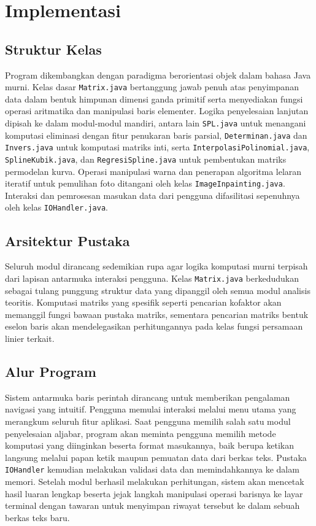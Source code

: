 \documentclass[12pt, a4paper]{article}
\begin{document}
\section{Implementasi}

\subsection{Struktur Kelas}
Program dikembangkan dengan paradigma berorientasi objek dalam bahasa Java murni. Kelas dasar \texttt{Matrix.java} bertanggung jawab penuh atas penyimpanan data dalam bentuk himpunan dimensi ganda primitif serta menyediakan fungsi operasi aritmatika dan manipulasi baris elementer. Logika penyelesaian lanjutan dipisah ke dalam modul-modul mandiri, antara lain \texttt{SPL.java} untuk menangani komputasi eliminasi dengan fitur penukaran baris parsial, \texttt{Determinan.java} dan \texttt{Invers.java} untuk komputasi matriks inti, serta \texttt{InterpolasiPolinomial.java}, \texttt{SplineKubik.java}, dan \texttt{RegresiSpline.java} untuk pembentukan matriks permodelan kurva. Operasi manipulasi warna dan penerapan algoritma lelaran iteratif untuk pemulihan foto ditangani oleh kelas \texttt{ImageInpainting.java}. Interaksi dan pemrosesan masukan data dari pengguna difasilitasi sepenuhnya oleh kelas \texttt{IOHandler.java}.

\subsection{Arsitektur Pustaka}
Seluruh modul dirancang sedemikian rupa agar logika komputasi murni terpisah dari lapisan antarmuka interaksi pengguna. Kelas \texttt{Matrix.java} berkedudukan sebagai tulang punggung struktur data yang dipanggil oleh semua modul analisis teoritis. Komputasi matriks yang spesifik seperti pencarian kofaktor akan memanggil fungsi bawaan pustaka matriks, sementara pencarian matriks bentuk eselon baris akan mendelegasikan perhitungannya pada kelas fungsi persamaan linier terkait.

\subsection{Alur Program}
Sistem antarmuka baris perintah dirancang untuk memberikan pengalaman navigasi yang intuitif. Pengguna memulai interaksi melalui menu utama yang merangkum seluruh fitur aplikasi. Saat pengguna memilih salah satu modul penyelesaian aljabar, program akan meminta pengguna memilih metode komputasi yang diinginkan beserta format masukannya, baik berupa ketikan langsung melalui papan ketik maupun pemuatan data dari berkas teks. Pustaka \texttt{IOHandler} kemudian melakukan validasi data dan memindahkannya ke dalam memori. Setelah modul berhasil melakukan perhitungan, sistem akan mencetak hasil luaran lengkap beserta jejak langkah manipulasi operasi barisnya ke layar terminal dengan tawaran untuk menyimpan riwayat tersebut ke dalam sebuah berkas teks baru.
\end{document}
